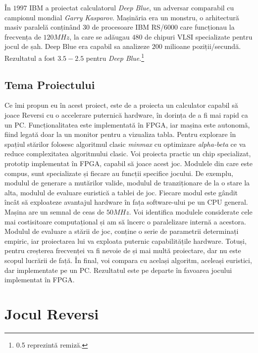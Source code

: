 \documentclass[12pt,twoside,a4paper,fleqn]{book}
\theoremstyle{definition}
\begin{document}
În $1997$ IBM a proiectat calculatorul \emph{Deep Blue}, un adversar comparabil cu campionul mondial \emph{Garry Kasparov}. Mașinăria era un monstru\cite{deepblue}, o arhitectură masiv paralelă conținând $30$ de procesoare IBM RS/6000 care funcționau la frecvența de $120MHz$, la care se adăugau $480$ de chipuri VLSI specializate pentru jocul de șah. Deep Blue era capabil sa analizeze $200$ milioane poziții/secundă. Rezultatul a fost $3.5 - 2.5$ pentru \emph{Deep Blue}.\footnote{0.5 reprezintă remiză.}\\
\section{Tema Proiectului}
Ce îmi propun eu în acest proiect, este de a proiecta un calculator capabil să joace Reversi cu o accelerare puternică hardware, în dorința de a fi mai rapid ca un PC. Funcționalitatea este implementată în FPGA, iar mașina este autonomă, fiind legată doar la un monitor pentru a vizualiza tabla. Pentru explorare în spațiul stărilor folosesc algoritmul clasic \emph{minmax} cu optimizare \emph{alpha-beta} ce va reduce complexitatea algoritmului clasic. Voi proiecta practic un chip specializat, prototip implementat în FPGA, capabil să joace acest joc. Modulele din care este compus, sunt specializate și fiecare au funcții specifice jocului. De exemplu, modulul de generare a mutărilor valide, modulul de tranziționare de la o stare la alta, modulul de evaluare euristică a tablei de joc. Fiecare modul este gândit încât să exploateze avantajul hardware în fața software-ului pe un CPU general. Mașina are un semnal de ceas de $50MHz$. Voi identifica modulele considerate cele mai costisitoare computațional și am să încerc o paralelizare internă a acestora. Modulul de evaluare a stării de joc, conține o serie de parametrii determinați empiric, iar proiectarea lui va exploata puternic capabilitățile hardware. Totuși, pentru creșterea frecvenței va fi nevoie de și mai multă proiectare, dar nu este scopul lucrării de față. În final, voi compara cu același algoritm, aceleași euristici, dar implementate pe un PC. Rezultatul este pe departe în favoarea jocului implementat în FPGA.\\

\chapter{Jocul Reversi}
\end{document}
